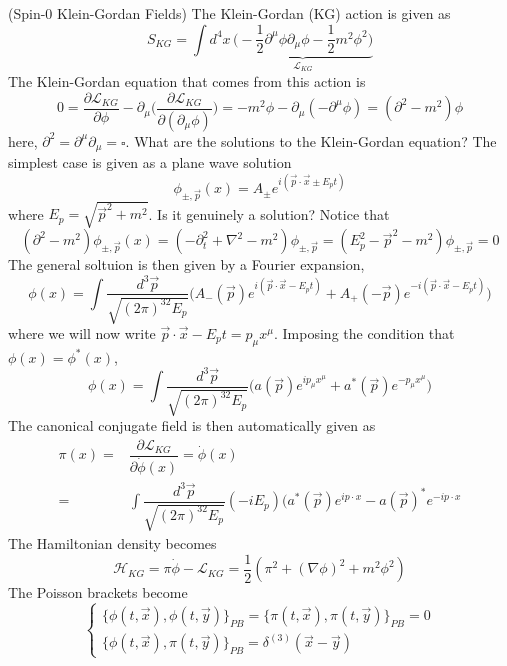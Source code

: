 \begin{defi}
(Spin-0 Klein-Gordan Fields) The Klein-Gordan (KG) action is given as
\[S_{KG}=\int d^{4}x\,\underbrace{\Big(-\dfrac{1}{2}\partial ^{\mu }\phi \partial _{\mu }\phi -\dfrac{1}{2}m^2\phi ^2\Big)}_{\mathcal{L}_{KG}}\]
The Klein-Gordan equation that comes from this action is 
\[0=\dfrac{\partial \mathcal{L}_{KG}}{\partial \phi }-\partial _{\mu }\Big(\dfrac{\partial \mathcal{L}_{KG}}{\partial (\partial _{\mu }\phi )} \Big)=-m^2\phi -\partial _{\mu }(-\partial ^{\mu }\phi )=(\partial^2-m^2)\phi \]
here, $\partial ^2=\partial ^{\mu }\partial _{\mu }=\square$. What are the solutions to the Klein-Gordan equation? The simplest case is given as a plane wave solution
\[\phi _{\pm,\vec{p}}(x)=A_{\pm}e^{i(\vec{p}\cdot \vec{x}\pm E_{p}t)}\]
where $E_{p}=\sqrt{\vec{p}^2+m^2}$. Is it genuinely a solution? Notice that
\[(\partial ^2-m^2)\phi _{\pm,\vec{p}}(x)=(-\partial _{t}^2+\nabla ^2-m^2)\phi _{\pm, \vec{p}}=(E_{p}^2-\vec{p}^2-m^2)\phi _{\pm, \vec{p}}=0\]
The general soltuion is then given by a Fourier expansion,
\[\phi (x)=\int \dfrac{d^3\vec{p}}{\sqrt{(2\pi)^32E_{p}}}\Big(A_{-}(\vec{p})e^{i(\vec{p}\cdot \vec{x}-E_{p}t)}+A_{+}(-\vec{p})e^{-i(\vec{p}\cdot \vec{x}-E_{p}t)}\Big)\]
where we will now write $\vec{p}\cdot \vec{x}-E_{p}t=p_{\mu }x^{\mu }$. Imposing the condition that $\phi (x)=\phi^{*} (x)$,
\[\phi (x)=\int \dfrac{d^3\vec{p}}{\sqrt{(2\pi )^32E_{p}}}\Big(a(\vec{p})e^{ip_{\mu }x^{\mu }}+a^{*}(\vec{p})e^{-p_{\mu }x^{\mu }}\Big)\]
The canonical conjugate field is then automatically given as 
\[\begin{align*}
	\pi (x)=&\dfrac{\partial \mathcal{L}_{KG}}{\partial \dot{\phi }(x)}=\dot{\phi}(x) \\
=&\int \dfrac{d^3\vec{p}}{\sqrt{(2\pi )^32E_{p}}}(-iE_{p})(a^{*}(\vec{p})e^{ip\cdot x}-a(\vec{p})^{*}e^{-ip\cdot x}
\end{align*}\]
The Hamiltonian density becomes
\[\mathcal{H}_{KG}=\pi \dot{\phi }-\mathcal{L}_{KG}=\dfrac{1}{2}(\pi ^2+(\nabla \phi )^2+m^2\phi ^2)\]
The Poisson brackets become
\[\begin{cases}
\{\phi (t,\vec{x}),\phi (t,\vec{y})\}_{PB}=\{\pi (t,\vec{x}),\pi (t,\vec{y})\}_{PB}=0\\
\{\phi (t,\vec{x}),\pi (t,\vec{y})\}_{PB}=\delta ^{(3)}(\vec{x}-\vec{y})
\end{cases}\]
\end{defi}
\vspace{2ex}
